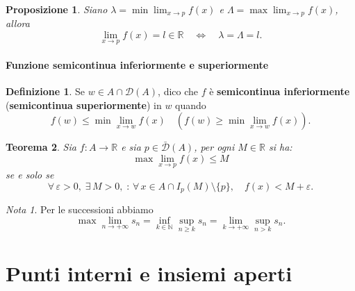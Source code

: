 \documentclass{article}
\theoremstyle{plain}
\newtheorem{thm}{Teorema}[section]
\newtheorem{prop}[thm]{Proposizione}
\theoremstyle{definition}
\newtheorem{defn}{Definizione}[section]
\theoremstyle{remark}
\newtheorem{note}{Nota}
\begin{document}
\vspace{10pt}

\begin{bxthm}
\begin{prop}
    Siano $\lambda=\min\lim_{x\to p}f(x)$ e $\Lambda=\max\lim_{x\to p}f(x)$, allora 
    \[\lim_{x\to p}f(x)=l\in\mathbb{R} \quad\iff\quad \lambda=\Lambda=l.\]
\end{prop}
\end{bxthm}

\vspace{10pt}

\paragraph{Funzione semicontinua inferiormente e superiormente}
\begin{bxthm}
\begin{defn}
    Se $w\in A\cap\mathcal{D}(A)$, dico che $f$ è \textbf{semicontinua inferiormente} (\textbf{semicontinua superiormente}) in $w$ quando 
    \[f(w)\leq\min\lim_{x\to w}f(x)\quad(f(w)\geq\min\lim_{x\to w}f(x)).\]
\end{defn}
\end{bxthm}

\vspace{10pt}

\begin{bxthm}
\begin{thm}
    Sia $f:A\to\mathbb{R}$ e sia $p\in\bar{\mathcal{D}}(A)$, per ogni $M\in\mathbb{R}$ si ha: 
    \[\max\lim_{x\to p}f(x)\leq M\] se e solo se 
    \[\forall\,\varepsilon>0,\;\exists\,M>0,\;:\,\forall\,x\in A\cap I_p(M)\setminus\{p\},\quad f(x)<M+\varepsilon.\]
\end{thm}
\end{bxthm}

\vspace{10pt}

\begin{note}
    Per le successioni abbiamo 
    \[\max\lim_{n\to+\infty}s_n=\inf_{k\in\mathbb{N}}\sup_{n\geq k}s_n=\lim_{k\to+\infty}\sup_{n>k}s_n.\]    
\end{note}

\vspace{50pt}
\section{Punti interni e insiemi aperti}
\vspace{50pt}
\end{document}
